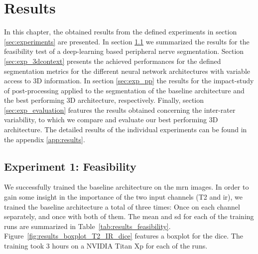 \chapter{Results}
In this chapter, the obtained results from the defined experiments in section \ref{sec:experiments} are presented. In section \ref{sec:exp_feas} we summarized the results for the feasibility test of a deep-learning based peripheral nerve segmentation.
Section \ref{sec:exp_3dcontext} presents the achieved performances for the defined segmentation metrics for the different neural network architectures with variable access to 3D information.
In section \ref{sec:exp_pp} the results for the impact-study of post-processing applied to the segmentation of the baseline architecture and the best performing 3D architecture, respectively.
Finally, section \ref{sec:exp_evaluation} features the results obtained concerning the inter-rater variability, to which we compare and evaluate our best performing 3D architecture.
The detailed results of the individual experiments can be found in the appendix \ref{app:results}.

\section{Experiment 1: Feasibility} \label{sec:exp_feas} %
We successfully trained the baseline architecture on the \gls{mrn} images. In order to gain some insight in the importance of the two input channels (T2 and \gls{ir}), we trained the baseline architecture a total of three times: Once on each channel separately, and once with both of them. The mean and \gls{sd} for each of the training runs are summarized in Table~\ref{tab:results_feasibility}. Figure~\ref{fig:results_boxplot_T2_IR_dice} features a boxplot for the \acrlong{dice}. The training took 3 hours on a NVIDIA Titan Xp for each of the runs.

